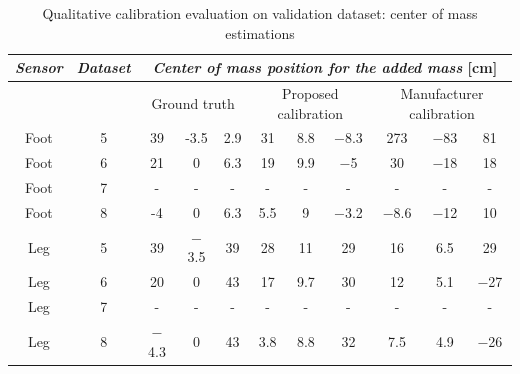  \begin{table}[ht] 
 \caption{Qualitative calibration evaluation on validation dataset: center of mass estimations}
 \centering 
  \begin{tabular}{ | c | c | c |  c |  c | c | c |  c | c |  c | c |} 
  \hline
              \emph{Sensor}   & \emph{Dataset} & \multicolumn{9}{c|}{\emph{Center of mass position for the added mass} [cm]} \\
 \hline \rowcolor[gray]{.9}   &             &  \multicolumn{3}{c|}{Ground truth} &  \multicolumn{3}{p{2.8cm}|}{Proposed \hspace{3em}  calibration} & \multicolumn{3}{p{3cm}|}{Manufacturer calibration} \\ 
 \hline
  \rowcolor[gray]{.9} Foot    &  5     & 39  & {-}3.5 & 2.9  & 31  & 8.8 & $-$8.3  & 273  & $-$83 & 81  \\ 
  \rowcolor[gray]{.9} Foot	&   6   &  21 &  0   & 6.3  & 19  & 9.9 & $-$5    & 30   & $-$18 & 18  \\
  \rowcolor[gray]{.9} Foot	&  7   &  -  & -    & -    & -   &  -  & -     & -    &  -  & -  \\
  \rowcolor[gray]{.9}  Foot	&  8   &  {-}4 & 0   & 6.3  & 5.5 &  9  & $-$3.2  & $-$8.6 & $-$12 & 10 \\
 \hline 
 Leg  &  5    & 39 & $-$3.5 & 39  & 28 & 11 & 29 & 16 & 6.5 & 29  \\ 
Leg	&  6  & 20 & 0  & 43  & 17 & 9.7 & 30 & 12 & 5.1 & $-$27  \\
Leg	&  7  & -  & -  & -   & -  & -   & -  & -  & -   & -  \\
 Leg	&  8  & $-$4.3 & 0 & 43 & 3.8 & 8.8 & 32 & 7.5 & 4.9 & $-$26 \\
\hline
\end{tabular} 
\label{table:cmass} %
\end{table}




